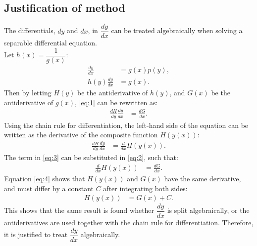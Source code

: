 \subsection{Justification of method} 
The differentials, $dy$ and $dx$, in $\dfrac{dy}{dx}$ can be treated algebraically when solving a separable differential equation. 
\\
Let $h(x) = \dfrac{1}{g(x)}$:
 \begin{align}
	\frac{dy}{dx} &= g(x)p(y), \nonumber\\
	h(y)\frac{dy}{dx} &= g(x). \label{eq:1}
 \end{align}
Then by letting $H(y)$ be the antiderivative of $h(y)$, and $G(x)$ be the antiderivative of $g(x)$, \eqref{eq:1} can be rewritten as: 
 \begin{align}
 	\frac{dH}{dy}\frac{dy}{dx} &= \frac{dG}{dx}. \label{eq:2}
 \end{align}
Using the chain rule for differentiation, %
the left-hand side of the equation can be written as the derivative of the composite function $H\left(y(x)\right)$:
 \begin{align}
	\frac{dH}{dy}\frac{dy}{dx} &=\frac{d}{dx} H\left(y(x)\right).
	\label{eq:3}
 \end{align}
The term in \eqref{eq:3} can be substituted in \eqref{eq:2}, such that:
 \begin{align}
 	\frac{d}{dx}H\left(y(x)\right) &= \frac{dG}{dx}\label{eq:4}.
 \end{align}
Equation \eqref{eq:4} shows that $H\left(y(x)\right)$ and $G(x)$ have the same derivative, and must differ by a constant $C$ after integrating both sides:
 \begin{align*}
 	H\left(y(x)\right) &= G(x) + C.
 \end{align*}
This shows that the same result is found whether $\dfrac{dy}{dx}$ is split algebraically, or the antiderivatives are used together with the chain rule for differentiation. Therefore, it is justified to treat $\dfrac{dy}{dx}$ algebraically.


